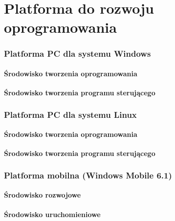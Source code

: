 \newpage
\part{Platforma do rozwoju oprogramowania}
\section{Platforma PC dla systemu Windows}
\subsection{Środowisko tworzenia oprogramowania}
\subsection{Środowisko tworzenia programu sterującego}
\section{Platforma PC dla systemu Linux}
\subsection{Środowisko tworzenia oprogramowania}
\subsection{Środowisko tworzenia programu sterującego}
\section{Platforma mobilna (Windows Mobile 6.1)}
\subsection{Środowisko rozwojowe}
\subsection{Środowisko uruchomieniowe}